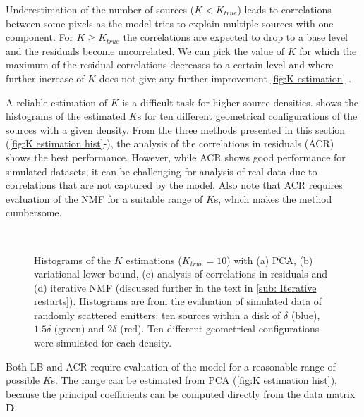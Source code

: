 \begin{enumerate}
Underestimation of the number of sources ($K<K_{true}$) leads to correlations between some pixels as the model tries to explain multiple sources with one component. For $K\geq K_{true}$ the correlations are expected to drop to a base level and the residuals become uncorrelated. We can pick the value of $K$ for which the maximum of the residual correlations decreases to a certain level and where further increase of $K$ does not give any further improvement \autoref{fig:K estimation}\gggg-\iii.
\end{enumerate}

A reliable estimation of $K$ is a difficult task for higher source densities.  shows the histograms of the estimated $K$s for ten different geometrical configurations of the sources with a given density. From the three methods presented in this section  (\autoref{fig:K estimation hist}\aaa-\ccc), the analysis of the correlations in residuals (ACR) shows the best performance. However, while ACR shows good performance for simulated datasets, it can be challenging for analysis of real data due to correlations that are not captured by the model. Also note that ACR requires evaluation of the NMF for a suitable range of $K$s, which makes the method cumbersome.
%
\begin{figure}[!hbt]
	\newcommand{\sizef}{.4}		
	\centering
	\\
	\caption{Histograms of the $K$ estimations ($K_{true}=10$) with (a) PCA, (b) variational lower bound, (c) analysis of correlations in residuals and (d) iterative NMF (discussed further in the text in \autoref{sub: Iterative restarts}). Histograms are from the evaluation of simulated data of randomly scattered emitters: ten sources within a disk of $\delta$ (blue), $1.5\delta$ (green) and $2\delta$ (red). Ten different geometrical configurations were simulated for each density.}
	\label{fig:K estimation hist}
\end{figure}

Both LB and ACR require evaluation of the model for a reasonable range of possible $K$s. The range can be estimated from PCA  (\autoref{fig:K estimation hist}\ccc), because the principal coefficients can be computed directly from the data matrix $\bm{D}$.

